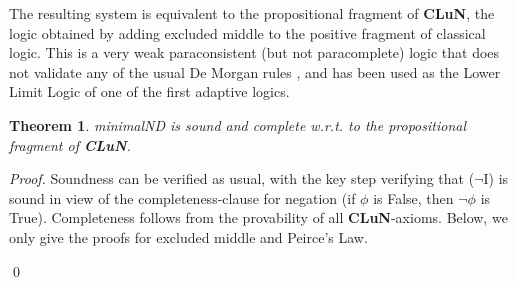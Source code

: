 \documentclass[]{article}
\newtheorem{theorem}{Theorem}
\newcommand{\Turn}[2]
    { {#1}\vdash_{\textbf{\sf s}}  {#2}}
\newcommand{\TurnNext}[2]
    { {#1}\vdash_{\textbf{\sf s+1}}  {#2}}
\newcommand{\TurnOne}[2]
    { {#1}\vdash_{\textbf{\sf 1}}  {#2}}
\newcommand{\TurnTwo}[2]
    { {#1}\vdash_{\textbf{\sf 2}}  {#2}}
\newcommand{\TurnThree}[2]
    { {#1}\vdash_{\textbf{\sf 3}}  {#2}}
\newcommand{\TurnFour}[2]
    { {#1}\vdash_{\textbf{\sf 4}}  {#2}}
\newcommand{\TurnFive}[2]
    { {#1}\vdash_{\textbf{\sf 5}}  {#2}}
\newcommand{\TurnSix}[2]
    { {#1}\vdash_{\textbf{\sf 6}}  {#2}}
\newcommand{\TurnSeven}[2]
    { {#1}\vdash_{\textbf{\sf 7}}  {#2}}
\begin{document}
The resulting system is equivalent to the propositional fragment of \textbf{CLuN}, the logic obtained by adding excluded middle to the positive fragment of classical logic. This is a very weak paraconsistent (but not paracomplete) logic that does not validate any of the usual De Morgan rules \cite{Batens:LogiqueAnalyse:1980}, and has been used as the Lower Limit Logic of one of the first adaptive logics.

\begin{theorem}\label{thm:clun}
    {\sf minimalND} is sound and complete w.r.t. to the propositional fragment of \textbf{CLuN}.
\end{theorem}
\noindent\textsl{Proof.} Soundness can be verified as usual, with the key step verifying that ($\neg$I) is sound in view of the completeness-clause for negation (if $\phi$ is False, then $\neg \phi$ is True). Completeness follows from the provability of all \textbf{CLuN}-axioms. Below, we only give the proofs for excluded middle and Peirce's Law.
\qed

%
%
%
%
%
\end{document}
